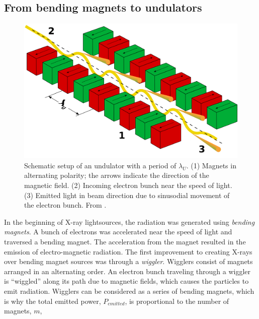 \subsection{From bending magnets to undulators}\label{sec:undulator}
\begin{figure}[t]
	\centering
		\includegraphics[width=1.00\textwidth]{images/Undulator.png}
	\caption[Schematic setup of an undulator.]{Schematic setup of an undulator with a period of $\lambda_{U}$. (1) Magnets in alternating polarity; the arrows indicate the direction of the magnetic field. (2) Incoming electron bunch near the speed of light. (3) Emitted light in beam direction due to sinusodial movement of the electron bunch. From \cite{holst-2005-wiki}.}
	\label{fig:undulator}
\end{figure}
In the beginning of X-ray lightsources, the radiation was generated using \textit{bending magnets}. A bunch of electrons was accelerated near the speed of light and traversed a bending magnet. The acceleration from the magnet resulted in the emission of electro-magnetic radiation. The first improvement to creating X-rays over bending magnet sources was through a \textit{wiggler}. Wigglers consist of magnets arranged in an alternating order. An electron bunch traveling through a wiggler is ``wiggled'' along its path due to magnetic fields, which causes the particles to emit radiation. Wigglers can be considered as a series of bending magnets, which is why the total emitted power, $P_{emitted}$, is proportional to the number of magnets, $m$, \citep{Brown-1983-NIMPR}
